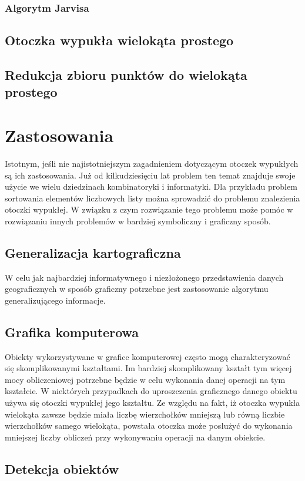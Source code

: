         \subsection{Algorytm Jarvisa}
        
        
        \section{Otoczka wypukła wielokąta prostego}
        \section{Redukcja zbioru punktów do wielokąta prostego}
    \chapter{Zastosowania} 
    Istotnym, jeśli nie najistotniejszym zagadnieniem dotyczącym otoczek wypukłych są ich zastosowania. Już od kilkudziesięciu lat problem ten temat znajduje swoje użycie we wielu dziedzinach kombinatoryki i informatyki. Dla przykładu problem sortowania elementów liczbowych listy można sprowadzić do problemu znalezienia otoczki wypukłej. W związku z czym rozwiązanie tego problemu może pomóc w rozwiązaniu innych problemów w bardziej symboliczny i graficzny sposób.
        \section{Generalizacja kartograficzna}
        W celu jak najbardziej informatywnego i niezłożonego przedstawienia danych geograficznych w sposób graficzny potrzebne jest zastosowanie algorytmu generalizującego informacje.
		\section{Grafika komputerowa}
		Obiekty wykorzystywane w grafice komputerowej często mogą charakteryzować się skomplikowanymi kształtami. Im bardziej skomplikowany kształt tym więcej mocy obliczeniowej potrzebne będzie w celu wykonania danej operacji na tym kształcie. W niektórych przypadkach do uproszczenia graficznego danego obiektu używa się otoczki wypukłej jego kształtu. Ze względu na fakt, iż otoczka wypukła wielokąta zawsze będzie miała liczbę wierzchołków mniejszą lub równą liczbie wierzchołków samego wielokąta, powstała otoczka może posłużyć do wykonania mniejszej liczby obliczeń przy wykonywaniu operacji na danym obiekcie.
		\section{Detekcja obiektów}
